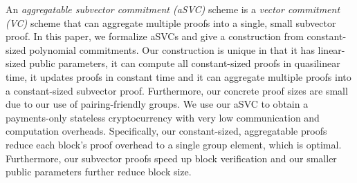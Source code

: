 An \textit{aggregatable subvector commitment (aSVC)} scheme is a \textit{vector commitment (VC)} scheme that can aggregate multiple proofs into a single, small subvector proof.
In this paper, we formalize aSVCs and give a construction from constant-sized polynomial commitments.
Our construction is unique in that it has linear-sized public parameters, it can compute all constant-sized proofs in quasilinear time, it updates proofs in constant time and it can aggregate multiple proofs into a constant-sized subvector proof.
Furthermore, our concrete proof sizes are small due to our use of pairing-friendly groups.
We use our aSVC to obtain a payments-only stateless cryptocurrency with very low communication and computation overheads.
Specifically, our constant-sized, aggregatable proofs reduce each block's proof overhead to a single group element, which is optimal.
Furthermore, our subvector proofs speed up block verification and our smaller public parameters further reduce block size.
